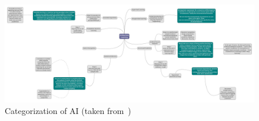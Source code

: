 \begin{figure}[htbp]
  \centering
  \includegraphics[width=\textwidth]{images/ai-categorization}
  \caption{Categorization of \ac{AI} (taken from~\cite{})}
  \label{fig:ai-categorization}
\end{figure}

\endinput

Machine Learning has become a topic of interest because of its large field of application (deepen). Artificial intelligence is a broad area of knowledge comprised with several branches where each one has a different configuration and purpose. As a result, we consider one question: what field should a new user start working with if the goal is to classify information from a specific data set? Our work responds to this question based on empirical experimentation where we identified that approaching Machine Learning through supervised linear regression models allows users to understand the basic applications while fulfilling their objective. Moreover, due to available resources such as high level TensorFlow Estimator API and the column-oriented data analysis API Pandas learning doesn’t require long(subjective) before the user can start working on Machine Learning projects. 